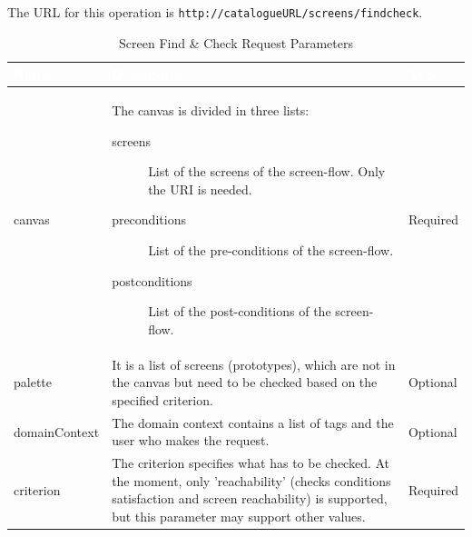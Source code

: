 \documentclass{fast_latex}
\begin{document}
The URL for this operation is \verb|http://catalogueURL/screens/findcheck|.

\begin{table}[htb!]
\caption{Screen Find \& Check Request Parameters}
\label{tab:screen_check_request}
\begin{center}
\begin{tabular}{|p{2.5cm}|p{9cm}|p{2cm}|}
\hline
\rowcolor{fast@lightgrey}\textcolor{white}{Name} &
                         \textcolor{white}{Description} &
                         \textcolor{white}{Type}\\ \hline
canvas & The canvas is divided in three lists:
\begin{description}
 \item[screens] List of the screens of the screen-flow. Only the URI is needed.
 \item[preconditions] List of the pre-conditions of the screen-flow.
 \item[postconditions] List of the post-conditions of the screen-flow.
 \end{description} & Required\\ \hline
palette & It is a list of screens (prototypes), which are not in the canvas but need to be checked based on the specified criterion. & Optional\\ \hline
domainContext & The domain context contains a list of tags and the user who makes the request. & Optional\\ \hline
criterion & The criterion specifies what has to be checked. At the moment, only 'reachability' (checks conditions satisfaction and screen reachability) is supported, but this parameter may support other values. & Required\\ \hline
\end{tabular}
\end{center}
\end{table}
\end{document}
